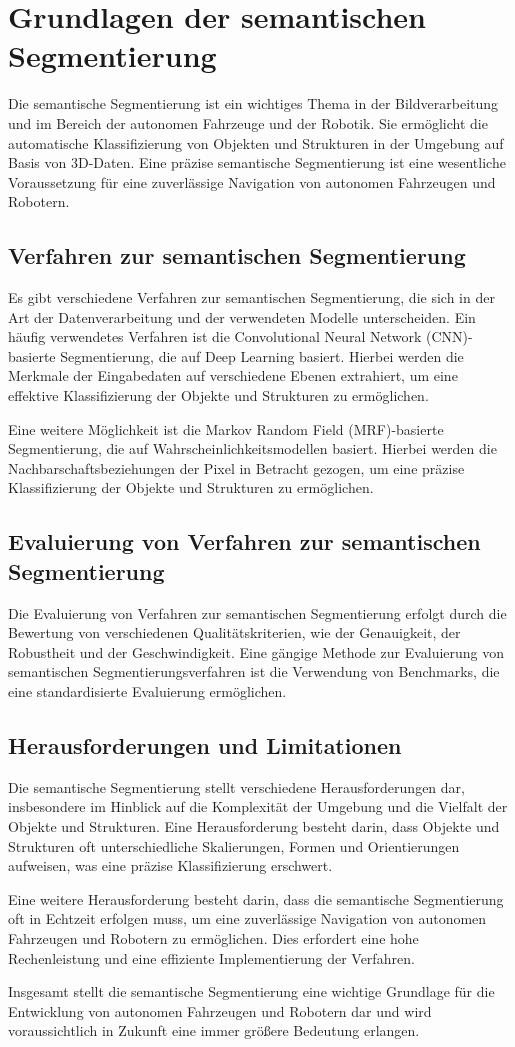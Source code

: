 \chapter{Grundlagen der semantischen Segmentierung}
Die semantische Segmentierung ist ein wichtiges Thema in der Bildverarbeitung
und im Bereich der autonomen Fahrzeuge und der Robotik. Sie ermöglicht die
automatische Klassifizierung von Objekten und Strukturen in der Umgebung auf
Basis von 3D-Daten. Eine präzise semantische Segmentierung ist eine wesentliche
Voraussetzung für eine zuverlässige Navigation von autonomen Fahrzeugen und
Robotern.
\section{Verfahren zur semantischen Segmentierung}
Es gibt verschiedene Verfahren zur semantischen Segmentierung, die sich in der
Art der Datenverarbeitung und der verwendeten Modelle unterscheiden. Ein häufig
verwendetes Verfahren ist die Convolutional Neural Network (CNN)-basierte
Segmentierung, die auf Deep Learning basiert. Hierbei werden die Merkmale der
Eingabedaten auf verschiedene Ebenen extrahiert, um eine effektive
Klassifizierung der Objekte und Strukturen zu ermöglichen.

Eine weitere Möglichkeit ist die Markov Random Field (MRF)-basierte
Segmentierung, die auf Wahrscheinlichkeitsmodellen basiert. Hierbei werden die
Nachbarschaftsbeziehungen der Pixel in Betracht gezogen, um eine präzise
Klassifizierung der Objekte und Strukturen zu ermöglichen.
\section{Evaluierung von Verfahren zur semantischen Segmentierung}
Die Evaluierung von Verfahren zur semantischen Segmentierung erfolgt durch die
Bewertung von verschiedenen Qualitätskriterien, wie der Genauigkeit, der
Robustheit und der Geschwindigkeit. Eine gängige Methode zur Evaluierung von
semantischen Segmentierungsverfahren ist die Verwendung von Benchmarks, die
eine standardisierte Evaluierung ermöglichen.
\section{Herausforderungen und Limitationen}
Die semantische Segmentierung stellt verschiedene Herausforderungen dar,
insbesondere im Hinblick auf die Komplexität der Umgebung und die Vielfalt der
Objekte und Strukturen. Eine Herausforderung besteht darin, dass Objekte und
Strukturen oft unterschiedliche Skalierungen, Formen und Orientierungen
aufweisen, was eine präzise Klassifizierung erschwert.

Eine weitere Herausforderung besteht darin, dass die semantische Segmentierung
oft in Echtzeit erfolgen muss, um eine zuverlässige Navigation von autonomen
Fahrzeugen und Robotern zu ermöglichen. Dies erfordert eine hohe Rechenleistung
und eine effiziente Implementierung der Verfahren.

Insgesamt stellt die semantische Segmentierung eine wichtige Grundlage für die
Entwicklung von autonomen Fahrzeugen und Robotern dar und wird voraussichtlich
in Zukunft eine immer größere Bedeutung erlangen.